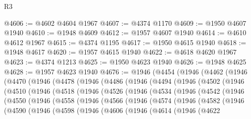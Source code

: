 \begin{lexlean}{R3}
\begin{coremodule}
@4606 := @4602 @4604 @1967
@4607 := @4374 @1170
@4609 := @1950 @4607 @1940
@4610 := @1948 @4609
@4612 := @1957 @4607 @1940
@4614 := @4610 @4612 @1967
@4615 := @4374 @1195
@4617 := @1950 @4615 @1940
@4618 := @1948 @4617
@4620 := @1957 @4615 @1940
@4622 := @4618 @4620 @1967
@4623 := @4374 @1213
@4625 := @1950 @4623 @1940
@4626 := @1948 @4625
@4628 := @1957 @4623 @1940
@4676 := @1946
    (@4454
      (@1946
        (@4462
          (@1946
            (@4470
              (@1946
                (@4478
                  (@1946
                    (@4486
                      (@1946
                        (@4494
                          (@1946
                            (@4502
                              (@1946
                                (@4510
                                  (@1946
                                    (@4518
                                      (@1946
                                        (@4526
                                          (@1946
                                            (@4534
                                              (@1946
                                                (@4542
                                                  (@1946
                                                    (@4550
                                                      (@1946
                                                        (@4558
                                                          (@1946
                                                            (@4566
                                                              (@1946
                                                                (@4574
                                                                  (@1946
                                                                    (@4582
                                                                      (@1946
                                                                        (@4590
                                                                          (@1946
                                                                            (@4598
                                                                              (@1946
                                                                                (@4606
                                                                                  (@1946
                                                                                    (@4614
                                                                                      (@1946
                                                                                        (@4622

\end{coremodule}
\end{lexlean}

